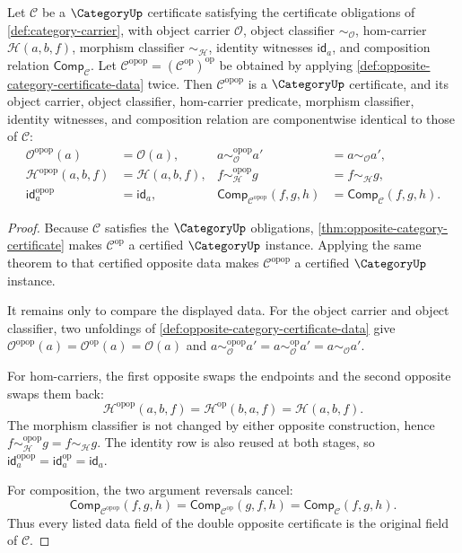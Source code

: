 \begin{theorem}
\label{thm:double-opposite-category-certificate-data-identity}
Let $\mathcal C$ be a $\CategoryUp$ certificate satisfying the certificate
obligations of \autoref{def:category-carrier}, with object carrier
$\mathcal O$, object classifier $\sim_{\mathcal O}$, hom-carrier
$\mathcal H(a,b,f)$, morphism classifier $\sim_{\mathcal H}$, identity
witnesses $\mathsf{id}_a$, and composition relation
$\mathsf{Comp}_{\mathcal C}$. Let
$\mathcal C^{\mathrm{opop}}=(\mathcal C^{\mathrm{op}})^{\mathrm{op}}$ be
obtained by applying \autoref{def:opposite-category-certificate-data} twice.
Then $\mathcal C^{\mathrm{opop}}$ is a $\CategoryUp$ certificate, and its
object carrier, object classifier, hom-carrier predicate, morphism classifier,
identity witnesses, and composition relation are componentwise identical to
those of $\mathcal C$:
$$
\begin{aligned}
\mathcal O^{\mathrm{opop}}(a)&=\mathcal O(a),&
 a\sim_{\mathcal O}^{\mathrm{opop}}a'&=a\sim_{\mathcal O}a',\\
\mathcal H^{\mathrm{opop}}(a,b,f)&=\mathcal H(a,b,f),&
 f\sim_{\mathcal H}^{\mathrm{opop}}g&=f\sim_{\mathcal H}g,\\
\mathsf{id}^{\mathrm{opop}}_a&=\mathsf{id}_a,&
\mathsf{Comp}_{\mathcal C^{\mathrm{opop}}}(f,g,h)&=
\mathsf{Comp}_{\mathcal C}(f,g,h).
\end{aligned}
$$
\end{theorem}
\begin{proof}
Because $\mathcal C$ satisfies the $\CategoryUp$ obligations,
\autoref{thm:opposite-category-certificate} makes $\mathcal C^{\mathrm{op}}$
a certified $\CategoryUp$ instance. Applying the same theorem to that certified
opposite data makes $\mathcal C^{\mathrm{opop}}$ a certified $\CategoryUp$
instance.

It remains only to compare the displayed data. For the object carrier and
object classifier, two unfoldings of
\autoref{def:opposite-category-certificate-data} give
$\mathcal O^{\mathrm{opop}}(a)=\mathcal O^{\mathrm{op}}(a)=\mathcal O(a)$
and
$a\sim_{\mathcal O}^{\mathrm{opop}}a'=a\sim_{\mathcal O}^{\mathrm{op}}a'=
a\sim_{\mathcal O}a'$.

For hom-carriers, the first opposite swaps the endpoints and the second
opposite swaps them back:
$$
\mathcal H^{\mathrm{opop}}(a,b,f)
=\mathcal H^{\mathrm{op}}(b,a,f)
=\mathcal H(a,b,f).
$$
The morphism classifier is not changed by either opposite construction, hence
$f\sim_{\mathcal H}^{\mathrm{opop}}g=f\sim_{\mathcal H}g$. The identity row is
also reused at both stages, so
$\mathsf{id}^{\mathrm{opop}}_a=\mathsf{id}^{\mathrm{op}}_a=\mathsf{id}_a$.

For composition, the two argument reversals cancel:
$$
\mathsf{Comp}_{\mathcal C^{\mathrm{opop}}}(f,g,h)
=\mathsf{Comp}_{\mathcal C^{\mathrm{op}}}(g,f,h)
=\mathsf{Comp}_{\mathcal C}(f,g,h).
$$
Thus every listed data field of the double opposite certificate is the original
field of $\mathcal C$.
\end{proof}

